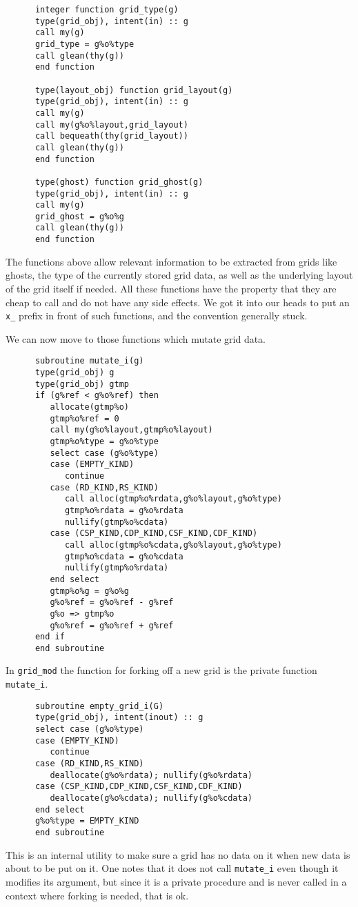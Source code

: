 \begin{verbatim}
      integer function grid_type(g)
      type(grid_obj), intent(in) :: g
      call my(g)
      grid_type = g%o%type
      call glean(thy(g))
      end function

      type(layout_obj) function grid_layout(g)
      type(grid_obj), intent(in) :: g
      call my(g)
      call my(g%o%layout,grid_layout)
      call bequeath(thy(grid_layout))
      call glean(thy(g))
      end function

      type(ghost) function grid_ghost(g)
      type(grid_obj), intent(in) :: g
      call my(g)
      grid_ghost = g%o%g
      call glean(thy(g))
      end function
\end{verbatim}
The functions above allow relevant information to be extracted
from grids like ghosts, the type of the currently stored
grid data, as well as the underlying layout of the grid itself
if needed.  All these functions have the property that they 
are cheap to call and do not have any side effects.
We got it into our heads to put an \verb+x_+ prefix in front of
such functions, and the convention generally stuck.

We can now move to those functions which mutate grid data.

\begin{verbatim}
      subroutine mutate_i(g)
      type(grid_obj) g
      type(grid_obj) gtmp
      if (g%ref < g%o%ref) then
         allocate(gtmp%o)
         gtmp%o%ref = 0
         call my(g%o%layout,gtmp%o%layout)
         gtmp%o%type = g%o%type
         select case (g%o%type)
         case (EMPTY_KIND)
            continue
         case (RD_KIND,RS_KIND)
            call alloc(gtmp%o%rdata,g%o%layout,g%o%type)
            gtmp%o%rdata = g%o%rdata
            nullify(gtmp%o%cdata)
         case (CSP_KIND,CDP_KIND,CSF_KIND,CDF_KIND)
            call alloc(gtmp%o%cdata,g%o%layout,g%o%type)
            gtmp%o%cdata = g%o%cdata
            nullify(gtmp%o%rdata)
         end select
         gtmp%o%g = g%o%g
         g%o%ref = g%o%ref - g%ref
         g%o => gtmp%o
         g%o%ref = g%o%ref + g%ref
      end if
      end subroutine
\end{verbatim}
In \verb+grid_mod+ the function for forking off a new grid is 
the private function \verb+mutate_i+.

\begin{verbatim}
      subroutine empty_grid_i(G)
      type(grid_obj), intent(inout) :: g
      select case (g%o%type)
      case (EMPTY_KIND)
         continue
      case (RD_KIND,RS_KIND)
         deallocate(g%o%rdata); nullify(g%o%rdata)
      case (CSP_KIND,CDP_KIND,CSF_KIND,CDF_KIND)
         deallocate(g%o%cdata); nullify(g%o%cdata)
      end select
      g%o%type = EMPTY_KIND
      end subroutine
\end{verbatim}
This is an internal utility to make sure a grid has no data on
it when new data is about to be put on it.  One notes that it
does not call \verb+mutate_i+ even though it modifies its argument,
but since it is a private procedure and is never called in a
context where forking is needed, that is ok.

